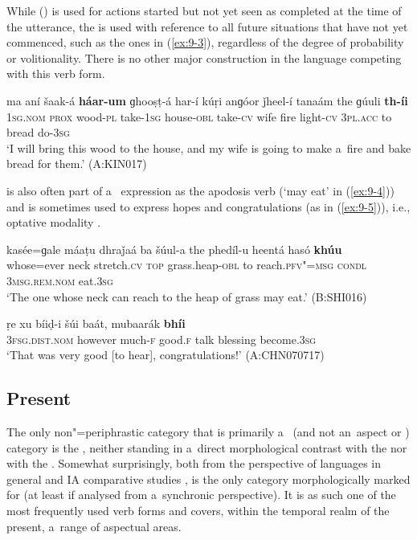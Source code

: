 While  () is used for actions started but not yet seen as completed at the time of the utterance, the  is used with reference to all future situations that have not yet commenced, such as the ones in (\ref{ex:9-3}), regardless of the degree of probability or volitionality. There is no other major construction in the language competing with this verb form.

\begin{exe}
\ex
\label{ex:9-3}
\gll ma aní šaak-á \textbf{háar-um} ɡhooṣṭ-á har-í kúṛi anɡóor ǰheel-í tanaám the ɡúuli \textbf{th-íi}\\
\textsc{1sg.nom} \textsc{prox} wood-\textsc{pl} take-\textsc{1sg} house-\textsc{obl} take-\textsc{cv} wife fire light-\textsc{cv} \textsc{3pl.acc} to bread do-\textsc{3sg}\\
\glt `I will bring this wood to the house, and my wife is going to make a~fire and bake bread for
them.' (A:KIN017)
\end{exe}

 is also often part of a~ expression as the apodosis verb (`may eat' in (\ref{ex:9-4})) and is sometimes used to express hopes and congratulations (as in (\ref{ex:9-5})), i.e., optative modality \citep[179]{bybeeetal1994}.

\begin{exe}
\ex
\label{ex:9-4}
\gll kasée=ɡale máaṭu dhraǰaá ba šúul-a the phedíl-u heentá hasó \textbf{khúu} \\
whose=ever neck stretch.\textsc{cv} \textsc{top} grass.heap-\textsc{obl}  to reach.\textsc{pfv"=msg } \textsc{condl} \textsc{3msg.rem.nom} eat.\textsc{3sg} \\
\glt `The one whose neck can reach to the heap of grass may eat.' (B:SHI016)

\ex
\label{ex:9-5}
\gll ṛe xu bíiḍ-i šúi baát, mubaarák \textbf{bhíi} \\
\textsc{3fsg.dist.nom} however much-\textsc{f} good.\textsc{f} talk blessing  become.\textsc{3sg} \\
\glt `That was very good [to hear], congratulations!' (A:CHN070717)
\end{exe}

\subsection{Present}
\label{subsec:9-1-3}

The only non"=periphrastic category that is primarily a~ (and not an~aspect or ) category is the , neither standing in a~direct morphological contrast with the  nor with the . Somewhat surprisingly, both from the perspective of languages in general \citep[103--128]{dahl1985} and IA comparative studies \citep[282, 288--289]{masica1991},  is the only category morphologically marked for  (at least if analysed from a~synchronic perspective). It is as such one of the most frequently used verb forms and covers, within the temporal realm of the present, a~range of aspectual areas. 




